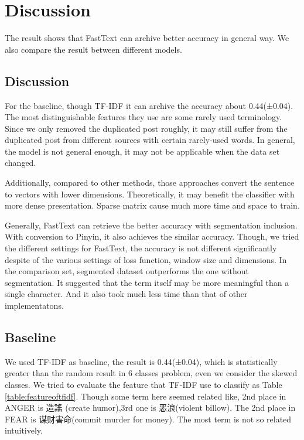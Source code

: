 \chapter{Discussion}

The result shows that FastText can archive better accuracy in general way. We also compare the result between different models.

\section{Discussion}


For the baseline, though TF-IDF it can archive the accuracy about 0.44(±0.04). 
The most distinguishable features they use are some rarely used terminology. 
Since we only removed the duplicated post roughly, it may still suffer from the duplicated post from different sources with certain rarely-used words. 
In general, the model is not general enough, it may not be applicable when the data set changed. 

Additionally, compared to other methods, those approaches convert the sentence to vectors with lower dimensions.
Theoretically, it may benefit the classifier with more dense presentation. Sparse matrix cause much more time and space to train.

Generally, FastText can retrieve the better accuracy with segmentation inclusion. 
With conversion to Pinyin, it also achieves the similar accuracy. Though, we tried the different settings for FastText,
the accuracy is not different significantly despite of the various settings of loss function, window size and dimensions. 
In the comparison set, segmented dataset outperforms the one without segmentation. 
It suggested that the term itself may be more meaningful than a single character. And it also took much less time than that of other implementatons.

\section{Baseline}

We used TF-IDF as baseline, the result is 0.44(±0.04), which is statistically greater than the random result in 6 classes problem, 
even we consider the skewed classes.  We tried to evaluate the feature that TF-IDF use to classify as Table \ref{table:featureoftfidf}. 
Though some term here seemed related like, 2nd place in ANGER is 造謠 (create humor),3rd one is 恶浪(violent billow). 
The 2nd place in FEAR is 谋财害命(commit murder for money). The most term is not so related intuitively. 

